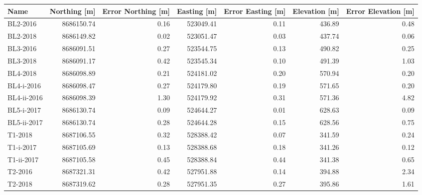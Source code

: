 \begin{tabular}{lrrrrrr}
\toprule
        Name &  Northing [m] &  Error Northing [m] &  Easting [m] &  Error Easting [m] &  Elevation [m] &  Error Elevation [m] \\
\midrule
    BL2-2016 &    8686150.74 &                0.16 &    523049.41 &               0.11 &         436.89 &                 0.48 \\
    BL2-2018 &    8686149.82 &                0.02 &    523051.47 &               0.03 &         437.74 &                 0.06 \\
    BL3-2016 &    8686091.51 &                0.27 &    523544.75 &               0.13 &         490.82 &                 0.25 \\
    BL3-2018 &    8686091.17 &                0.42 &    523545.34 &               0.10 &         491.39 &                 1.03 \\
    BL4-2018 &    8686098.89 &                0.21 &    524181.02 &               0.20 &         570.94 &                 0.20 \\
  BL4-i-2016 &    8686098.47 &                0.27 &    524179.80 &               0.19 &         571.65 &                 0.20 \\
 BL4-ii-2016 &    8686098.39 &                1.30 &    524179.92 &               0.31 &         571.36 &                 4.82 \\
  BL5-i-2017 &    8686130.74 &                0.09 &    524644.27 &               0.01 &         628.63 &                 0.09 \\
 BL5-ii-2017 &    8686130.74 &                0.28 &    524644.28 &               0.15 &         628.56 &                 0.75 \\
     T1-2018 &    8687106.55 &                0.32 &    528388.42 &               0.07 &         341.59 &                 0.24 \\
   T1-i-2017 &    8687105.69 &                0.13 &    528388.68 &               0.18 &         341.26 &                 0.12 \\
  T1-ii-2017 &    8687105.58 &                0.45 &    528388.84 &               0.44 &         341.38 &                 0.65 \\
     T2-2016 &    8687321.31 &                0.42 &    527951.88 &               0.14 &         394.88 &                 2.34 \\
     T2-2018 &    8687319.62 &                0.28 &    527951.35 &               0.27 &         395.86 &                 1.61 \\

\end{tabular}
